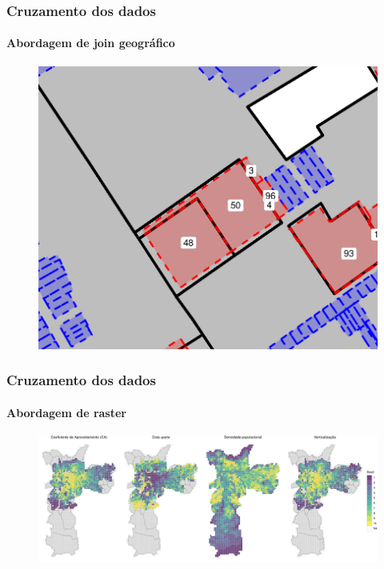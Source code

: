 \documentclass[%
    9pt, 
    aspectratio=169,
]{beamer}
\begin{document}
\begin{frame}
    \frametitle{Cruzamento dos dados}
    \framesubtitle{Abordagem de join geográfico}

    \begin{figure}
        \centering
        \includegraphics[width = .6\linewidth]{imagens/corte_lote.pdf}
    \end{figure}
\end{frame}

\begin{frame}
    \frametitle{Cruzamento dos dados}
    \framesubtitle{Abordagem de raster}

    \begin{figure}
        \centering
        \includegraphics[width = \linewidth]{imagens/rasters_wide.pdf}
    \end{figure}
\end{frame}
\end{document}
